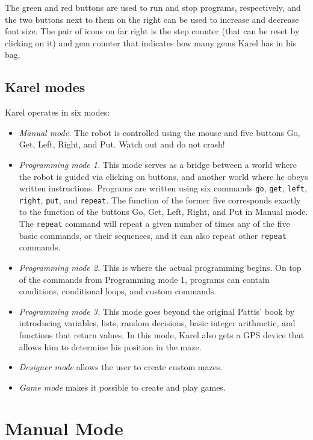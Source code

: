 The green and red 
buttons are used to run and stop programs, respectively, and the two buttons next to them on
the right can be used to increase and decrease font size. The pair of icons on far right is the 
step counter (that can be reset by clicking on it) and gem counter that indicates how many gems 
Karel has in his bag.

\subsection{Karel modes} \label{modes}

Karel operates in six modes:
\begin{itemize}
\item {\em Manual mode.} The robot is controlled using the mouse and five buttons Go, Get, Left, Right, and Put. 
      Watch out and do not crash!
\item {\em Programming mode 1.} This mode serves 
      as a bridge between a world where the robot is guided via clicking on buttons, and another 
      world where he obeys written instructions. Programs are written using 
      six commands {\tt go}, {\tt get}, {\tt left}, {\tt right}, {\tt put}, and {\tt repeat}. The
      function of the former five corresponds exactly to the function of the buttons Go, Get, Left, 
      Right, and Put in Manual mode. The {\tt repeat} command will repeat a given number of times 
      any of the five basic commands, or their sequences, and it can also repeat other {\tt repeat} commands. 
\item {\em Programming mode 2.} This is where the actual programming begins. On top of the commands 
      from Programming mode 1, programs can contain conditions, conditional loops, and custom commands.
\item {\em Programming mode 3.} This mode goes beyond the original Pattis' book by introducing variables, 
      lists, random decisions, basic integer arithmetic, and functions that 
      return values. In this mode, Karel also gets a GPS device that allows him to determine his position 
      in the maze. 
\item {\em Designer mode} allows the user to create custom mazes.
\item {\em Game mode} makes it possible to create and play games. 
\end{itemize}


\section{Manual Mode} \label{sec:manual}

